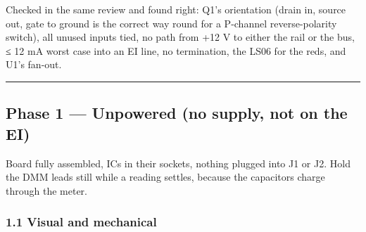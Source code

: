 \documentclass[
  10pt,
  twoside]{article}
\begin{document}
Checked in the same review and found right: Q1's orientation
(drain in, source out, gate to ground is the correct way
round for a P-channel reverse-polarity switch), all unused
inputs tied, no path from +12 V to either the rail or the
bus, ≤ 12 mA worst case into an EI line, no termination, the
LS06 for the reds, and U1's fan-out.

\begin{center}\rule{0.5\linewidth}{0.5pt}\end{center}

\clearpage
\hypertarget{phase-1-unpowered-no-supply-not-on-the-ei}{%
\subsection{Phase 1 --- Unpowered (no supply, not on the
EI)}\label{phase-1-unpowered-no-supply-not-on-the-ei}}

Board fully assembled, ICs in their sockets, nothing plugged
into J1 or J2. Hold the DMM leads still while a reading
settles, because the capacitors charge through the meter.

\hypertarget{visual-and-mechanical}{%
\subsubsection{1.1 Visual and
mechanical}\label{visual-and-mechanical}}
\end{document}
